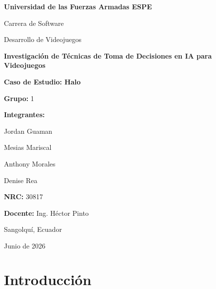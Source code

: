 \documentclass[12pt,letterpaper]{article}
\begin{document}
\vspace*{1.65cm}
\noindent\hspace*{4.65cm}
\begin{minipage}{0.66\textwidth}
  \begin{flushleft}
    {\Large\bfseries\color{espeGreen} Universidad de las Fuerzas Armadas ESPE\par}
    \vspace{0.25cm}
    {\large Carrera de Software\par}
    \vspace{0.2cm}
    {\large Desarrollo de Videojuegos\par}
    \vspace{1.55cm}
    {\fontsize{26}{31}\selectfont\bfseries\color{ink} Investigación de Técnicas de Toma de Decisiones en IA para Videojuegos\par}
    \vspace{0.35cm}
    {\Large\color{softGold}\bfseries Caso de Estudio: Halo\par}
    \vspace{1.0cm}
    \vspace{0.55cm}

    {\bfseries Grupo:} 1\par
    \vspace{0.25cm}
    {\bfseries Integrantes:}\par
    Jordan Guaman\par
    Mesias Mariscal\par
    Anthony Morales\par
    Denise Rea\par
    \vspace{0.35cm}
    {\bfseries NRC:} 30817\par
    {\bfseries Docente:} Ing. Héctor Pinto\par
    \vspace{0.55cm}
    Sangolquí, Ecuador\par
    Junio de 2026
  \end{flushleft}
\end{minipage}
\clearpage

\tableofcontents
\newpage

\section{Introducción}
\end{document}
